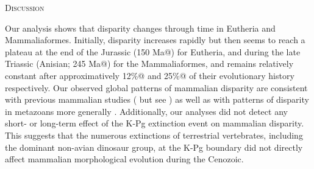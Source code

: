\documentclass[12pt,letterpaper]{article}
\renewcommand{\section}[1]{%
\bigskip
\begin{center}
\begin{Large}
\normalfont\scshape #1
\medskip
\end{Large}
\end{center}}
\begin{document}
\section{Discussion}

Our analysis shows that disparity changes through time in Eutheria and Mammaliaformes.
Initially, disparity increases rapidly but then seems to reach a plateau at the end of the Jurassic (150 Ma@) for Eutheria, and during the late Triassic (Anisian; 245 Ma@) for the Mammaliaformes, and remains relatively constant after approximatively 12\%@ and 25\%@ of their evolutionary history respectively.
Our observed global patterns of mammalian disparity are consistent with previous mammalian studies (\citealt{Close2015} but see \citealt{Grossnickle2013}) as well as with patterns of disparity in metazoans more generally \citep[e.g.][]{Hughes20082013}. 
Additionally, our analyses did not detect any short- or long-term effect of the K-Pg extinction event on mammalian disparity.
This suggests that the numerous extinctions of terrestrial vertebrates, including the dominant non-avian dinosaur group, at the K-Pg boundary did not directly affect mammalian morphological evolution during the Cenozoic.



\end{document}
